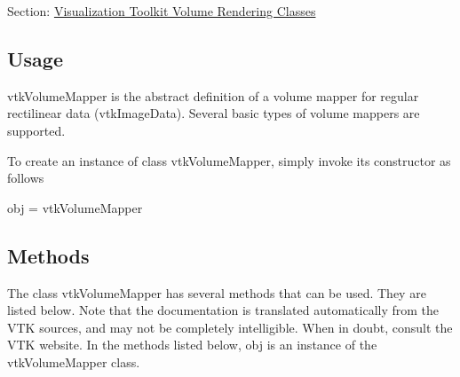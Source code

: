 Section\-: \hyperlink{sec_vtkvolumerendering}{Visualization Toolkit Volume Rendering Classes} \hypertarget{vtkwidgets_vtkxyplotwidget_Usage}{}\subsection{Usage}\label{vtkwidgets_vtkxyplotwidget_Usage}
vtk\-Volume\-Mapper is the abstract definition of a volume mapper for regular rectilinear data (vtk\-Image\-Data). Several basic types of volume mappers are supported.

To create an instance of class vtk\-Volume\-Mapper, simply invoke its constructor as follows \begin{DoxyVerb}  obj = vtkVolumeMapper
\end{DoxyVerb}
 \hypertarget{vtkwidgets_vtkxyplotwidget_Methods}{}\subsection{Methods}\label{vtkwidgets_vtkxyplotwidget_Methods}
The class vtk\-Volume\-Mapper has several methods that can be used. They are listed below. Note that the documentation is translated automatically from the V\-T\-K sources, and may not be completely intelligible. When in doubt, consult the V\-T\-K website. In the methods listed below, {\ttfamily obj} is an instance of the vtk\-Volume\-Mapper class. 
